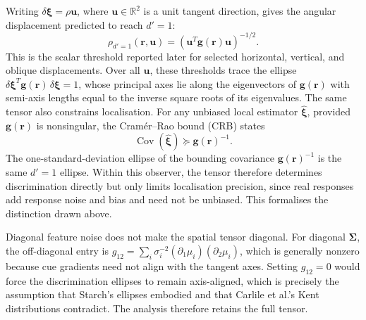 \documentclass[journal]{IEEEtran}
\begin{document}
Writing \(\delta\boldsymbol{\xi}=\rho\mathbf{u}\), where \(\mathbf{u}\in\mathbb{R}^{2}\) is a unit tangent direction, gives the angular displacement predicted to reach \(d'=1\):
\begin{equation}
\rho_{d'=1}(\mathbf{r},\mathbf{u})
=
\left(
\mathbf{u}^T \mathbf{g}(\mathbf{r}) \mathbf{u}
\right)^{-1/2}.
\label{eq:threshold}
\end{equation}
This is the scalar threshold reported later for selected horizontal, vertical, and oblique displacements. Over all \(\mathbf u\), these thresholds trace the ellipse \(\delta\boldsymbol\xi^T\mathbf g(\mathbf r)\,\delta\boldsymbol\xi=1\), whose principal axes lie along the eigenvectors of \(\mathbf g(\mathbf r)\) with semi-axis lengths equal to the inverse square roots of its eigenvalues. The same tensor also constrains localisation. For any unbiased local estimator \(\hat{\boldsymbol{\xi}}\), provided \(\mathbf g(\mathbf r)\) is nonsingular, the Cram\'er--Rao bound (CRB) states~\cite{Dayan2001}
\begin{equation}
\operatorname{Cov}(\hat{\boldsymbol{\xi}}) \succeq \mathbf{g}(\mathbf{r})^{-1}.
\end{equation}
The one-standard-deviation ellipse of the bounding covariance \(\mathbf g(\mathbf r)^{-1}\) is the same \(d'=1\) ellipse. Within this observer, the tensor therefore determines discrimination directly but only limits localisation precision, since real responses add response noise and bias and need not be unbiased. This formalises the distinction drawn above.

Diagonal feature noise does not make the spatial tensor diagonal. For diagonal \(\boldsymbol\Sigma\), the off-diagonal entry is
\(g_{12}=\sum_i \sigma_i^{-2}(\partial_1\mu_i)(\partial_2\mu_i)\),
which is generally nonzero because cue gradients need not align with the tangent axes. Setting \(g_{12}=0\) would force the discrimination ellipses to remain axis-aligned, which is precisely the assumption that Starch's ellipses embodied and that Carlile et al.'s Kent distributions contradict. The analysis therefore retains the full tensor.
\end{document}
